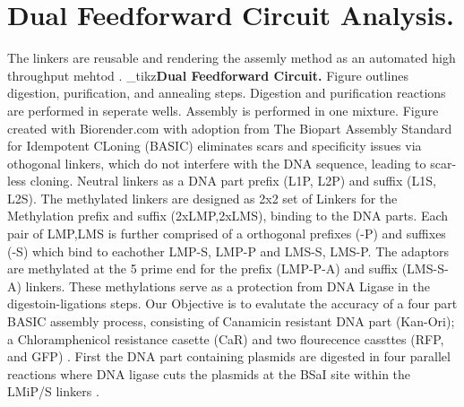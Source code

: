 {\section{Dual Feedforward Circuit Analysis.}
The linkers are reusable and rendering the assemly method as an automated high throughput mehtod \cite{Storch2015,Storch2017}.
\twocolend
{\noindent\footnotesize{}}
\twocolstart
{\noindent\footnotesize\imgtaskB_tikz{\footnotesize \textbf{Dual Feedforward Circuit.} Figure outlines digestion, purification, and annealing steps. Digestion and purification reactions are performed in seperate wells. Assembly is performed in one mixture.
Figure created with Biorender.com with adoption from \cite{Storch2015} }}
The Biopart Assembly Standard for Idempotent CLoning (BASIC) eliminates scars and specificity issues via othogonal linkers, which do not interfere with the DNA sequence, leading to scar-less cloning\cite{Storch2017}. 
Neutral linkers as a DNA part prefix (L1P, L2P) and suffix (L1S, L2S). The methylated linkers are designed as 2x2 set of Linkers for the Methylation prefix and suffix  (2xLMP,2xLMS), binding to the DNA parts. 
Each pair of LMP,LMS is further comprised of a orthogonal prefixes (-P) and suffixes (-S) which bind to eachother LMP-S, LMP-P and LMS-S, LMS-P. The adaptors are methylated at the 5 prime end for the prefix (LMP-P-A) and suffix (LMS-S-A) linkers. These methylations serve as a protection from DNA Ligase in the digestoin-ligations steps.
Our Objective is to evalutate the accuracy of a four part BASIC assembly process, consisting of Canamicin resistant DNA part (Kan-Ori); a Chloramphenicol resistance casette (CaR) and two flourecence cassttes (RFP, and GFP) .
First the DNA part containing plasmids are digested in four parallel reactions where DNA ligase cuts the plasmids at the BSaI site within the LMiP/S linkers .


}

